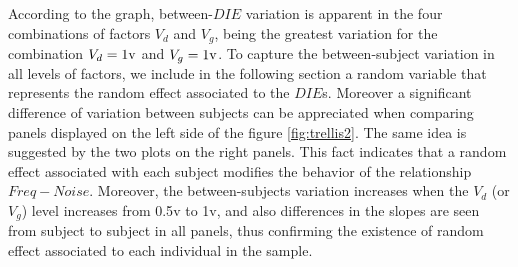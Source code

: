 \documentclass[sn-mathphys]{sn-jnl}%
\theoremstyle{thmstyleone}%
\theoremstyle{thmstyletwo}%
\theoremstyle{thmstylethree}%
\begin{document}
According to the graph, between-$DIE$ variation is apparent in the four combinations of factors $V_d$ and $V_g$, being the greatest variation for the combination $V_d=1 \rm{v}$ and $V_g=1 \rm{v}$. To capture the between-subject variation in all levels of factors, we include in the following section a random variable that represents the random effect associated to the $DIE$s.
Moreover a significant difference of variation between subjects can be appreciated when comparing panels displayed on the left side of the figure \ref{fig:trellis2}. The same idea is suggested by the two plots on the right panels. This fact indicates that a random effect associated with each subject modifies the behavior of the relationship $Freq-Noise$. Moreover, the between-subjects variation increases when the $V_d$ (or $V_g$) level increases from 0.5\rm{v} to 1\rm{v}, and also differences in the slopes are seen from subject to subject in all panels, thus confirming the existence of random effect associated to each individual in the sample.
\end{document}
